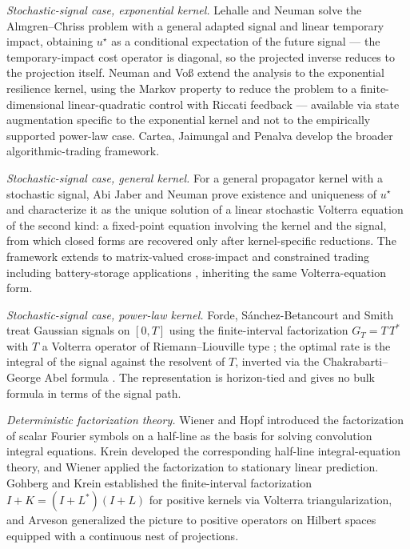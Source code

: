 \documentclass[11pt]{article}
\theoremstyle{plain}
\begin{document}
\emph{Stochastic-signal case, exponential kernel.} Lehalle and Neuman \citeyearpar{LehalleNeuman2019} solve the Almgren--Chriss problem with a general adapted signal and linear temporary impact, obtaining $u^\star$ as a conditional expectation of the future signal --- the temporary-impact cost operator is diagonal, so the projected inverse reduces to the projection itself. Neuman and Vo\ss{} \citeyearpar{NeumanVoss2022} extend the analysis to the exponential resilience kernel, using the Markov property to reduce the problem to a finite-dimensional linear-quadratic control with Riccati feedback --- available via state augmentation specific to the exponential kernel and not to the empirically supported power-law case. Cartea, Jaimungal and Penalva \citeyearpar{CarteaJaimungalPenalva2015} develop the broader algorithmic-trading framework.

\emph{Stochastic-signal case, general kernel.} For a general propagator kernel with a stochastic signal, Abi Jaber and Neuman \citeyearpar{AbiJaberNeuman2025} prove existence and uniqueness of $u^\star$ and characterize it as the unique solution of a linear stochastic Volterra equation of the second kind: a fixed-point equation involving the kernel and the signal, from which closed forms are recovered only after kernel-specific reductions. The framework extends to matrix-valued cross-impact \citep{AbiJaberNeumanTuschmann2024} and constrained trading including battery-storage applications \citep{AbiJaberDeCarvalhoPham2024}, inheriting the same Volterra-equation form.

\emph{Stochastic-signal case, power-law kernel.} Forde, S\'anchez-Betancourt and Smith \citeyearpar{FordeSanchezSmith2022} treat Gaussian signals on $[0,T]$ using the finite-interval factorization $G_T = T\,T^*$ with $T$ a Volterra operator of Riemann--Liouville type \citep[Ex.~6.2,~9.2]{PorterStirling1990}; the optimal rate is the integral of the signal against the resolvent of $T$, inverted via the Chakrabarti--George Abel formula \citep{ChakrabartiGeorge1994}. The representation is horizon-tied and gives no bulk formula in terms of the signal path.

\emph{Deterministic factorization theory.} Wiener and Hopf \citeyearpar{WienerHopf1931} introduced the factorization of scalar Fourier symbols on a half-line as the basis for solving convolution integral equations. Krein \citeyearpar{Krein1962} developed the corresponding half-line integral-equation theory, and Wiener \citeyearpar{Wiener1949} applied the factorization to stationary linear prediction. Gohberg and Krein \citeyearpar{GohbergKrein1970} established the finite-interval factorization $I+K = (I+L^*)(I+L)$ for positive kernels via Volterra triangularization, and Arveson \citeyearpar{Arveson1975} generalized the picture to positive operators on Hilbert spaces equipped with a continuous nest of projections.
\end{document}
